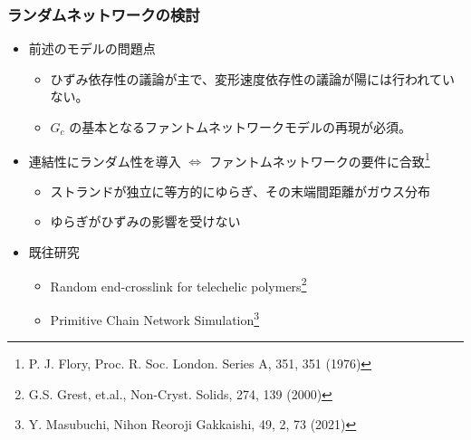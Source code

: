 \documentclass[aspectratio=169,11pt, dvipdfmx]{beamer}
\begin{document}
\begin{frame}
	\frametitle{ランダムネットワークの検討}
			\begin{itemize}
				\item 前述のモデルの問題点
				\begin{itemize}
					\item ひずみ依存性の議論が主で、変形速度依存性の議論が陽には行われていない。
					\item $G_c$ の基本となるファントムネットワークモデルの再現が必須。
				\end{itemize}
                \item \alert{連結性にランダム性}を導入 $\Leftrightarrow$ \alert{ファントムネットワークの要件}に合致\footnote{
							\scriptsize{P. J. Flory, Proc. R. Soc. London. Series A, 351, 351 (1976)}
						}
						\begin{itemize}
							\item ストランドが独立に等方的にゆらぎ、その末端間距離がガウス分布
							\item ゆらぎがひずみの影響を受けない
						\end{itemize}
				\item 既往研究
				\begin{itemize}
					\item Random end-crosslink for telechelic polymers\footnote{
						\scriptsize{G.S. Grest, et.al., Non-Cryst. Solids, 274, 139 (2000)}
						}
					\item Primitive Chain Network Simulation\footnote{
						\scriptsize{Y. Masubuchi, Nihon Reoroji Gakkaishi, 49, 2, 73 (2021)}
					}
				\end{itemize}
			\end{itemize}
\end{frame}
\end{document}
